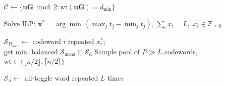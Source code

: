 \begin{algorithm}[t]
\footnotesize
\DontPrintSemicolon
\caption{Wear-leveled sequence generation\label{alg:seqgen}}
$\mathcal{C} \leftarrow \{\mathbf{u}\mathbf{G} \bmod 2 : \mathrm{wt}(\mathbf{u}\mathbf{G}) = d_{\min}\}$

Solve ILP: $\mathbf{x}^{*} = \arg\min\,(\max_{j} t_{j} - \min_{j} t_{j})$, 
$\sum_{i} x_{i} = L$,\ $x_{i} \in \mathbb{Z}_{\geq 0}$\;

$\mathcal{S}_{D_{min}} \leftarrow$ codeword $i$ repeated $x_{i}^{*}$; \\
get min. balanced $\mathcal{S}_{\mathrm{meas}} \subseteq \mathcal{S}_{\mathrm{d}}$\;
Sample pool of $P \gg L$ codewords, $\mathrm{wt} \in \{\lfloor n/2\rfloor, \lceil n/2\rceil\}$


$\mathcal{S}_{n} \leftarrow$ all-toggle word repeated $L$ times 
\end{algorithm}
